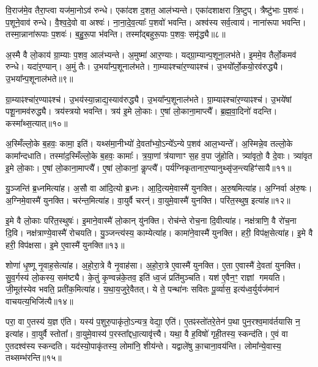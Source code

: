 वि॒राज॑मे॒व तैरा॒प्त्वा यज॑मा॒नो\-ऽव॑ रुन्धे।
एका॑दश द॒शत॒ आल॑भ्यन्ते।
एका॑दशाक्षरा त्रि॒ष्टुप्।
त्रैष्टु॑भाः प॒शवः॑।
प॒शूने॒वाव॑ रुन्धे।
वै॒श्व॒दे॒वो वा अश्वः॑।
ना॒ना॒दे॒व॒त्याः᳚ प॒शवो॑ भवन्ति।
अश्व॑स्य सर्व॒त्वाय॑।
नाना॑रूपा भवन्ति।
तस्मा॒न्नाना॑रूपाः प॒शवः॑।
ब॒हु॒रू॒पा भ॑वन्ति।
तस्मा᳚द्बहुरू॒पाः प॒शवः॒ समृ॑द्ध्यै॥८॥\ip\anuvakamend[आ॒र॒ण्याँल्लो॒को द॒शिन॑ आल॒भ्यन्ते॒ नाना॑रूपाः प॒शवो॒ द्वे च॑]

अ॒स्मै वै लो॒काय॑ ग्रा॒म्याः प॒शव॒ आल॑भ्यन्ते।
अ॒मुष्मा॑ आर॒ण्याः।
यद्ग्रा॒म्यान्प॒शूना॒लभ॑ते।
इ॒ममे॒व तैर्लो॒कमव॑ रुन्धे।
यदा॑र॒ण्यान्।
अ॒मुं तैः।
उ॒भया᳚न्प॒शूनाल॑भते।
गा॒म्याꣴश्चा॑र॒ण्याꣴश्च॑।
उ॒भयो᳚र्लो॒कयो॒रव॑रुद्ध्यै।
उ॒भया᳚न्प॒शूना\-ल॑भते॥९॥\ip

ग्रा॒म्याꣴश्चा॑\-र॒ण्याꣴश्च॑।
उ॒भय॑स्या॒न्नाद्य॒स्या\-व॑\-रुद्ध्यै।
उ॒भया᳚न्प॒शू\-नाल॑भते।
ग्रा॒म्याꣴश्चा॑\-र॒ण्याꣴश्च॑।
उ॒भये॑षां पशू॒नामव॑रुद्ध्यै।
त्रय॑स्त्रयो भवन्ति।
त्रय॑ इ॒मे लो॒काः।
ए॒षां लो॒काना॒माप्त्यै᳚।
ब्र॒ह्म॒वा॒दिनो॑ वदन्ति।
कस्मा᳚थ्स॒त्यात्॥१०॥\ip

अ॒स्मिँल्लो॒के ब॒हवः॒ कामा॒ इति॑।
यथ्स॑मा॒नीभ्यो॑ दे॒वता᳚भ्यो॒\-ऽन्ये᳚\-ऽन्ये प॒शव॑ आल॒भ्यन्ते᳚।
अ॒स्मिन्ने॒व तल्लो॒के कामा᳚न्दधाति।
तस्मा॑द॒स्मिँल्लो॒के ब॒हवः॒ कामाः᳚।
त्र॒या॒णां त्र॑याणाꣳ स॒ह व॒पा जु॑होति।
त्र्या॑वृतो॒ वै दे॒वाः।
त्र्या॑वृत इ॒मे लो॒काः।
ए॒षां लो॒काना॒माप्त्यै᳚।
ए॒षां लो॒कानां॒ कॢप्त्यै᳚।
पर्य॑ग्निकृतानार॒ण्या\-नुथ्सृ॑ज॒न्त्यहिꣳ॑सायै॥११॥\ip\anuvakamend[अव॑रुद्ध्या उ॒भया᳚न्प॒शूनाल॑भते स॒त्यादहिꣳ॑सायै]

यु॒ञ्जन्ति॑ ब्र॒ध्नमित्या॑ह।
अ॒सौ वा आ॑दि॒त्यो ब्र॒ध्नः।
आ॒दि॒त्यमे॒वास्मै॑ युनक्ति।
अ॒रु॒षमित्या॑ह।
अ॒ग्निर्वा अ॑रु॒षः।
अ॒ग्निमे॒वास्मै॑ युनक्ति।
चर॑न्त॒मित्या॑ह।
वा॒युर्वै चरन्॑।
वा॒युमे॒वास्मै॑ युनक्ति।
परि॑त॒स्थुष॒ इत्या॑ह॥१२॥\ip

इ॒मे वै लो॒काः परि॑त॒स्थुषः॑।
इ॒माने॒वास्मै॑ लो॒कान् यु॑नक्ति।
रोच॑न्ते रोच॒ना दि॒वीत्या॑ह।
नक्ष॑त्राणि॒ वै रो॑च॒ना दि॒वि।
नक्ष॑त्राण्ये॒वास्मै॑ रोचयति।
यु॒ञ्जन्त्य॑स्य॒ काम्येत्या॑ह।
कामा॑ने॒वास्मै॑ युनक्ति।
हरी॒ विप॑क्ष॒सेत्या॑ह।
इ॒मे वै हरी॒ विप॑क्षसा।
इ॒मे ए॒वास्मै॑ युनक्ति॥१३॥\ip

शोणा॑ धृ॒ष्णू नृ॒वाह॒सेत्या॑ह।
अ॒हो॒रा॒त्रे वै नृ॒वाह॑सा।
अ॒हो॒रा॒त्रे ए॒वास्मै॑ युनक्ति।
ए॒ता ए॒वास्मै॑ दे॒वता॑ युनक्ति।
सु॒व॒र्गस्य॑ लो॒कस्य॒ सम॑ष्ट्यै।
के॒तुं कृ॒ण्वन्न॑के॒तव॒ इति॑ ध्व॒जं प्रति॑\-मुञ्चति।
यश॑ ए॒वैन॒ꣳ॒ राज्ञां गमयति।
जी॒मूत॑स्येव भवति॒ प्रती॑क॒मित्या॑ह।
य॒था॒\-य॒जु\-रे॒वै\-तत्।
ये ते॒ पन्था॑नः सवितः पू॒र्व्यास॒ इत्य॑ध्व॒र्युर्यज॑मानं वाचयत्य॒भिजि॑त्यै॥१४॥\ip

परा॒ वा ए॒तस्य॑ य॒ज्ञ ए॑ति।
यस्य॑ प॒शुरु॒पाकृ॑तो॒\-ऽन्यत्र॒ वेद्या॒ एति॑।
ए॒तꣴस्तो॑तरे॒तेन॑ प॒था पुन॒रश्व॒माव॑र्तयासि न॒ इत्या॑ह।
वा॒युर्वै स्तोता᳚।
वा॒युमे॒वास्य॑ प॒रस्ता᳚द्दधा॒त्यावृ॑त्त्यै।
यथा॒ वै ह॒विषो॑ गृही॒तस्य॒ स्कन्द॑ति।
ए॒वं वा ए॒तदश्व॑स्य स्कन्दति।
यद॑स्यो॒पाकृ॑तस्य॒ लोमा॑नि॒ शीय॑न्ते।
यद्वाले॑षु का॒चाना॒वय॑न्ति।
लोमा᳚न्ये॒वास्य॒ तथ्सम्भ॑रन्ति॥१५॥\ip

